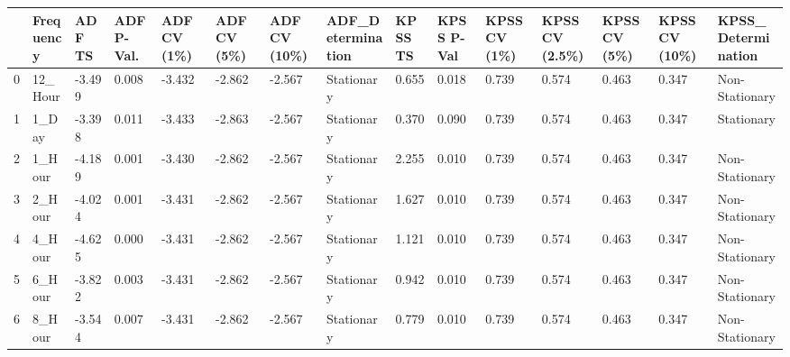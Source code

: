 \begin{tabular}{lllllllllllllll}
\toprule
 & Frequency & ADF TS & ADF P-Val. & ADF CV (1\%) & ADF CV (5\%) & ADF CV (10\%) & ADF_Determination & KPSS TS & KPSS P-Val & KPSS CV (1\%) & KPSS CV (2.5\%) & KPSS CV (5\%) & KPSS CV (10\%) & KPSS_Determination \\
\midrule
0 & 12_Hour & -3.499 & 0.008 & -3.432 & -2.862 & -2.567 & Stationary & 0.655 & 0.018 & 0.739 & 0.574 & 0.463 & 0.347 & Non-Stationary \\
1 & 1_Day & -3.398 & 0.011 & -3.433 & -2.863 & -2.567 & Stationary & 0.370 & 0.090 & 0.739 & 0.574 & 0.463 & 0.347 & Stationary \\
2 & 1_Hour & -4.189 & 0.001 & -3.430 & -2.862 & -2.567 & Stationary & 2.255 & 0.010 & 0.739 & 0.574 & 0.463 & 0.347 & Non-Stationary \\
3 & 2_Hour & -4.024 & 0.001 & -3.431 & -2.862 & -2.567 & Stationary & 1.627 & 0.010 & 0.739 & 0.574 & 0.463 & 0.347 & Non-Stationary \\
4 & 4_Hour & -4.625 & 0.000 & -3.431 & -2.862 & -2.567 & Stationary & 1.121 & 0.010 & 0.739 & 0.574 & 0.463 & 0.347 & Non-Stationary \\
5 & 6_Hour & -3.822 & 0.003 & -3.431 & -2.862 & -2.567 & Stationary & 0.942 & 0.010 & 0.739 & 0.574 & 0.463 & 0.347 & Non-Stationary \\
6 & 8_Hour & -3.544 & 0.007 & -3.431 & -2.862 & -2.567 & Stationary & 0.779 & 0.010 & 0.739 & 0.574 & 0.463 & 0.347 & Non-Stationary \\
\bottomrule
\end{tabular}
